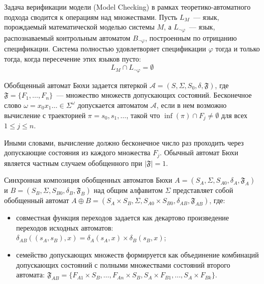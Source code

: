 Задача верификации модели (Model Checking) в рамках теоретико-автоматного подхода сводится к операциям над множествами. Пусть $L_M$~--- язык, порождаемый математической моделью системы $M$, а $L_{\neg\varphi}$~--- язык, распознаваемый контрольным автоматом $B_{\neg\varphi}$, построенным по отрицанию спецификации. Система полностью удовлетворяет спецификации $\varphi$ тогда и только тогда, когда пересечение этих языков пусто:
\begin{equation}\label{eq:language_intersection}
    L_M \cap L_{\neg\varphi} = \emptyset
\end{equation}

\begin{definition}\label{def:generalized_buchi}
    Обобщенный автомат Бюхи задается пятеркой $\mathcal{A} = (S, \Sigma, S_0, \delta, \mathfrak{F})$, где $\mathfrak{F} = \{F_1, \dots, F_n\}$~--- множество множеств допускающих состояний. Бесконечное слово $\omega = x_0 x_1 \dots \in \Sigma^\omega$ допускается автоматом $\mathcal{A}$, если в нем возможно вычисление с траекторией $\pi = s_0, s_1, \dots$, такой что $\inf(\pi) \cap F_j \neq \emptyset$ для всех $1 \le j \le n$. 
    
    Иными словами, вычисление должно бесконечное число раз проходить через допускающие состояния из каждого множества $F_j$. Обычный автомат Бюхи является частным случаем обобщенного при $|\mathfrak{F}| = 1$.
\end{definition}


\begin{definition}\label{def:buchi_composition}
    Синхронная композиция обобщенных автоматов Бюхи $A = (S_A, \Sigma, S_{A0}, \delta_A, \mathfrak{F}_A)$ и $B = (S_B, \Sigma, S_{B0}, \delta_B, \mathfrak{F}_B)$ над общим алфавитом $\Sigma$ представляет собой обобщенный автомат $A \oplus B = (S_A \times S_B, \Sigma, S_{A0} \times S_{B0}, \delta_{AB}, \mathfrak{F}_{AB})$, где:
    \begin{itemize}
        \item совместная функция переходов задается как декартово произведение переходов исходных автоматов: $\delta_{AB}((s_A, s_B), x) = \delta_A(s_A, x) \times \delta_B(s_B, x)$;
        \item семейство допускающих множеств формируется как объединение комбинаций допускающих состояний с полными множествами состояний второго автомата: $\mathfrak{F}_{AB} = \{F_{A1} \times S_B, \dots, F_{An} \times S_B, S_A \times F_{B1}, \dots, S_A \times F_{Bk}\}$.
    \end{itemize}
\end{definition}

